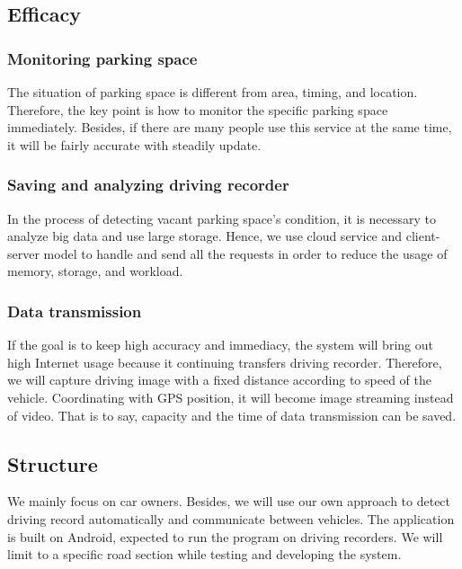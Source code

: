 \documentclass[journal,article,submit,moreauthors,pdftex,10pt,a4paper]{mdpi}
\begin{document}
%
\subsection{Efficacy}
%

%
\subsubsection{Monitoring parking space}
%

The situation of parking space is different from area, timing, and
location. Therefore, the key point is how to monitor the specific
parking space immediately. Besides, if there are many people use this
service at the same time, it will be fairly accurate with steadily
update.

%
\subsubsection{Saving and analyzing driving recorder}
%

In the process of detecting vacant parking space's condition, it is
necessary to analyze big data and use large storage. Hence, we use cloud
service and client-server model to handle and send all the requests in
order to reduce the usage of memory, storage, and workload.

%
\subsubsection{Data transmission}
%

If the goal is to keep high accuracy and immediacy, the system will
bring out high Internet usage because it continuing transfers driving
recorder. Therefore, we will capture driving image with a fixed distance
according to speed of the vehicle. Coordinating with GPS position, it
will become image streaming instead of video. That is to say, capacity
and the time of data transmission can be saved.

%
\subsection{Structure}
%

We mainly focus on car owners. Besides, we will use our own approach to
detect driving record automatically and communicate between vehicles.
The application is built on Android, expected to run the program on
driving recorders. We will limit to a specific road section while
testing and developing the system.
\end{document}
